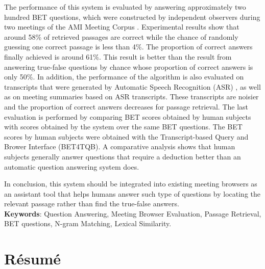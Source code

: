 The performance of this system is evaluated by answering approximately two hundred BET questions, which were constructed by independent observers during two meetings of the AMI Meeting Corpus \cite{AMI_corpus}. Experimental results show that around 58\% of retrieved passages are correct while the chance of randomly guessing one correct passage is less than 4\%. The proportion of correct answers finally achieved is around 61\%. This result is better than the result from answering true-false questions by chance whose proportion of correct answers is only 50\%. In addition, the performance of the algorithm is also evaluated on transcripts that were generated by Automatic Speech Recognition (ASR) , as well as on meeting summaries based on ASR transcripts. These transcripts are noisier and the proportion of correct answers decreases for passage retrieval. The last evaluation is performed by comparing BET scores obtained by human subjects with scores obtained by the system over the same BET questions. The BET scores by human subjects were obtained with the Transcript-based Query and Brower Interface (BET4TQB)\cite{popescubelis2007otm}. A comparative analysis shows that human subjects generally answer questions that require a deduction better than an automatic question answering system does. 

In conclusion, this system should be integrated into existing meeting browsers as an assistant tool that helps humans answer such type of questions by locating the relevant passage rather than find the true-false answers. \\

\textbf{Keywords}: Question Answering, Meeting Browser Evaluation, Passage Retrieval, BET questions, N-gram Matching, Lexical Similarity.
\small


\pagebreak

\section*{R\'esum\'e}

